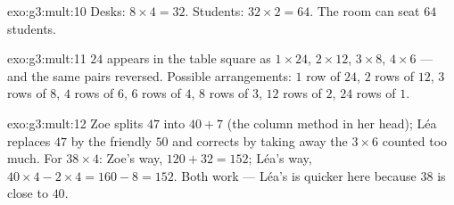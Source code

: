 \begin{solution}{exo:g3:mult:10}
Desks: $8 \times 4 = 32$. Students: $32 \times 2 = 64$. The room can
seat $64$ students.
\end{solution}

\begin{solution}{exo:g3:mult:11}
$24$ appears in the table square as $1 \times 24$, $2 \times 12$,
$3 \times 8$, $4 \times 6$ --- and the same pairs reversed. Possible
arrangements: $1$ row of $24$, $2$ rows of $12$, $3$ rows of $8$,
$4$ rows of $6$, $6$ rows of $4$, $8$ rows of $3$, $12$ rows of $2$,
$24$ rows of $1$.
\end{solution}

\begin{solution}{exo:g3:mult:12}
Zoe splits $47$ into $40 + 7$ (the column method in her head); Léa
replaces $47$ by the friendly $50$ and corrects by taking away the
$3 \times 6$ counted too much. For $38 \times 4$: Zoe's way,
$120 + 32 = 152$; Léa's way, $40 \times 4 - 2 \times 4 = 160 - 8 =
152$. Both work --- Léa's is quicker here because $38$ is close to
$40$.
\end{solution}
